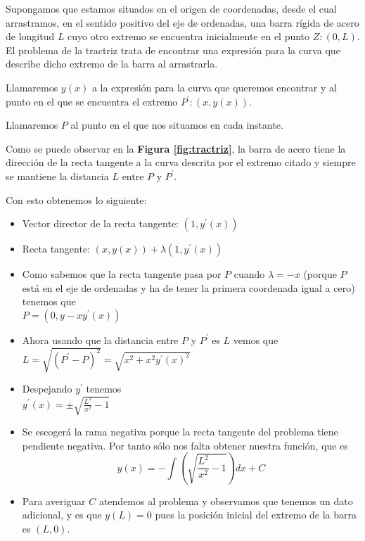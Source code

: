 \documentclass{mathnotes}
\begin{document}
\begin{example}
Supongamos que estamos situados en el origen de coordenadas, desde el cual arrastramos, en el sentido positivo del eje de ordenadas, una barra rígida de acero de longitud $L$ cuyo otro extremo se encuentra inicialmente en el punto $Z:(0,L)$. El problema de la tractriz trata de encontrar una expresión para la curva que describe dicho extremo de la barra al arrastrarla.

Llamaremos $y(x)$ a la expresión para la curva que queremos encontrar y al punto en el que se encuentra el extremo $P^\prime:(x, y(x))$.

Llamaremos $P$ al punto en el que nos situamos en cada instante.

Como se puede observar en la \textbf{Figura \ref{fig:tractriz}}, la barra de acero tiene la dirección de la recta tangente a la curva descrita por el extremo citado y siempre se mantiene la distancia $L$ entre $P$ y $P^\prime$.

Con esto obtenemos lo siguiente:
\begin{itemize}
\item Vector director de la recta tangente: $(1, y^\prime(x))$
\item Recta tangente: $(x,y(x)) + \lambda(1, y^\prime(x))$
\item Como sabemos que la recta tangente pasa por $P$ cuando $\lambda = -x$ (porque $P$ está en el eje de ordenadas y ha de tener la primera coordenada igual a cero) tenemos que \\$P=(0, y-xy^\prime(x))$
\item Ahora usando que la distancia entre $P$ y $P^\prime$ es $L$ vemos que \\$L = \sqrt{(P^\prime-P)^2} = \sqrt{x^2+x^2y^\prime(x)^2}$
\item Despejando $y^\prime$ tenemos \\$y^\prime(x)=\pm\sqrt{\frac{L^2}{x^2}-1}$
\item Se escogerá la rama negativa porque la recta tangente del problema tiene pendiente negativa. Por tanto sólo nos falta obtener nuestra función, que es $$y(x) = -\int{(\sqrt{\frac{L^2}{x^2}-1})dx} + C$$
\item Para averiguar $C$ atendemos al problema y observamos que tenemos un dato adicional, y es que $y(L)=0$ pues la posición inicial del extremo de la barra es $(L,0)$.
\end{itemize}
\end{example}
\end{document}
